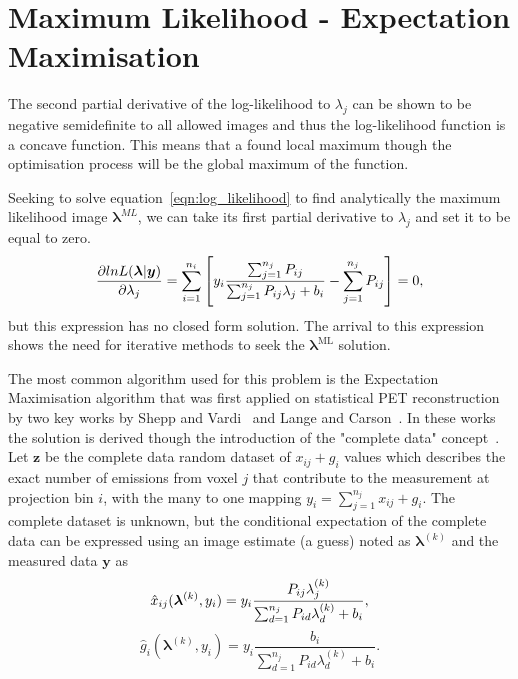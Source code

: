 \section{Maximum Likelihood - Expectation Maximisation}
\label{section:MLEM}
The second partial derivative of the log-likelihood to $\lambda_j$ can be shown to be negative semidefinite to all allowed images and thus the log-likelihood function is a concave function. This means that a found local maximum though the optimisation process will be the global maximum of the function.

Seeking to solve equation~\ref{eqn:log_likelihood} to find analytically the maximum likelihood image $\bm{\lambda}^{ML}$, we can take its first partial derivative to $\lambda_j$ and set it to be equal to zero. 
\begin{equation}
\frac{\partial lnL(\bm{\lambda}|\bm{y})}{\partial \lambda_j} = \sum_{i=1}^{n_i}\left[  y_i \frac{\sum_{j=1}^{n_j} P_{ij} }{\sum_{j=1}^{n_j} P_{ij} \lambda_j + b_i} -\sum_{j=1}^{n_j} P_{ij}
\right]  = 0 \\,
\end{equation}
but this expression has no closed form solution.
The arrival to this expression shows the need for iterative methods to seek the $\bm{\lambda}^{\textrm{ML}}$ solution. 

The most common algorithm used for this problem is the Expectation Maximisation algorithm that was first applied on statistical PET reconstruction by two key works by Shepp and Vardi~\cite{Vardi1985} and Lange and Carson~\cite{Lange1984}. In these works the solution is derived though the introduction of the "complete data" concept~\cite{Dempster1977}. \\
Let $\bm{z}$ be the complete data random dataset of $x_{ij} + g_i$ values which describes the exact number of emissions from voxel $j$ that contribute to the measurement at projection bin $i$, with the many to one mapping 
\mbox{$y_i = \sum_{j=1}^{n_j} x_{ij} + g_i$}.
The complete dataset is unknown, but the conditional expectation of the complete data can be expressed using an image estimate (a guess) noted as $\bm{\lambda}^{(k)}$ and the measured data $\bm{y}$ as 
%
\begin{equation}
\label{eq:Complete_Data_Expectation1}
\hat{x}_{ij}(\bm{\lambda}^{(k)},y_i) = y_i
\frac{P_{ij} \lambda_j^{(k)}}{\sum_{d=1}^{n_j} P_{id}\lambda_d^{(k)} + b_i} \\ , 
\end{equation}
%
\begin{equation}
\label{eq:Complete_Data_Expectation2}
\hat{g}_{i}(\bm{\lambda}^{(k)},y_i) = y_i 
\frac{b_i}{\sum_{d=1}^{n_j} P_{id}\lambda_d^{(k)} + b_i} . 
\end{equation}
%

